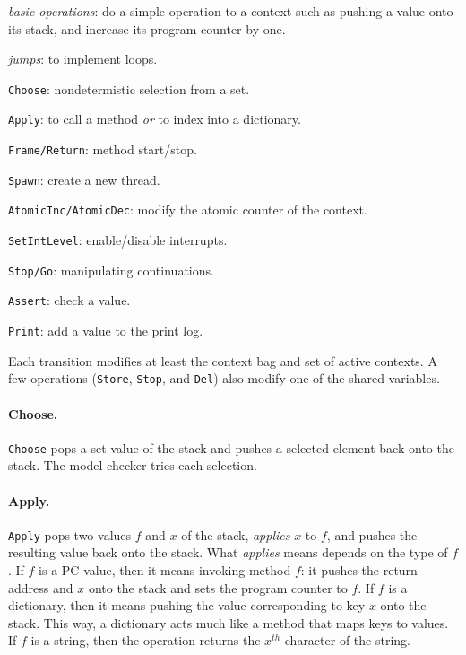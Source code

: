 \documentclass[twocolumn]{article}
\begin{document}
\begin{compactitem}
\item \emph{basic operations}: do a simple operation to a context
such as pushing a value onto its stack, and increase its program
counter by one.
\item \emph{jumps}: to implement loops.
\item \texttt{Choose}: nondetermistic selection from a set.
\item \texttt{Apply}: to call a method \emph{or} to index into a dictionary.
\item \texttt{Frame/Return}: method start/stop.
\item \texttt{Spawn}: create a new thread.
\item \texttt{AtomicInc/AtomicDec}: modify the atomic counter of the context.
\item \texttt{SetIntLevel}: enable/disable interrupts.
\item \texttt{Stop/Go}: manipulating continuations.
\item \texttt{Assert}: check a value.
\item \texttt{Print}: add a value to the print log.
\end{compactitem}

Each transition modifies at least the context bag and set of active
contexts.
A few operations (\texttt{Store}, \texttt{Stop}, and \texttt{Del})
also modify one of the shared variables.

\paragraph{Choose.} \texttt{Choose} pops a set value of the stack
and pushes a selected element back onto the stack.  The model checker
tries each selection.

\paragraph{Apply.}  \texttt{Apply} pops two values $f$ and $x$ of the stack,
\emph{applies} $x$ to $f$, and pushes the resulting value back onto the
stack.  What \emph{applies} means depends on the type of $f$.  If $f$ is
a PC value, then it means invoking method $f$: it pushes the return address
and $x$ onto the stack and sets the program counter to $f$.  If $f$ is a
dictionary, then it means pushing the value corresponding to key $x$ onto
the stack.  This way, a dictionary acts much like a method that maps keys
to values.  If $f$ is a string, then the operation returns the $x^{th}$
character of the string.
\end{document}
